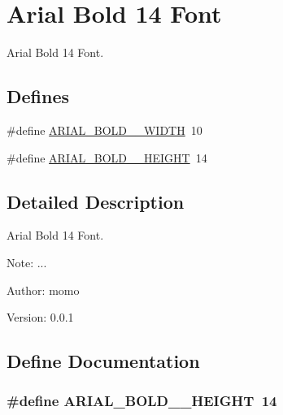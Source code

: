 \hypertarget{group__graphic__device__font__arial14}{
\section{Arial Bold 14 Font}
\label{group__graphic__device__font__arial14}
}
Arial Bold 14 Font.  


\subsection*{Defines}
\begin{CompactItemize}
\item 
\#define \hyperlink{group__graphic__device__font__arial14_gea609b33503f156623ed45a35d449754}{ARIAL\_\-BOLD\_\_\-WIDTH}~10
\item 
\#define \hyperlink{group__graphic__device__font__arial14_gcffe3e6f04dad38f6ec40a947d91718b}{ARIAL\_\-BOLD\_\_\-HEIGHT}~14
\end{CompactItemize}


\subsection{Detailed Description}
Arial Bold 14 Font. 

\begin{Desc}
\item[Note:]... \end{Desc}
\begin{Desc}
\item[Author:]momo \end{Desc}
\begin{Desc}
\item[Version:]0.0.1 \end{Desc}


\subsection{Define Documentation}
\hypertarget{group__graphic__device__font__arial14_gcffe3e6f04dad38f6ec40a947d91718b}{
\subsubsection[{ARIAL\_\-BOLD\_\-14\_\-HEIGHT}]{\setlength{\rightskip}{0pt plus 5cm}\#define ARIAL\_\-BOLD\_\_\-HEIGHT~14}}
\label{group__graphic__device__font__arial14_gcffe3e6f04dad38f6ec40a947d91718b}


